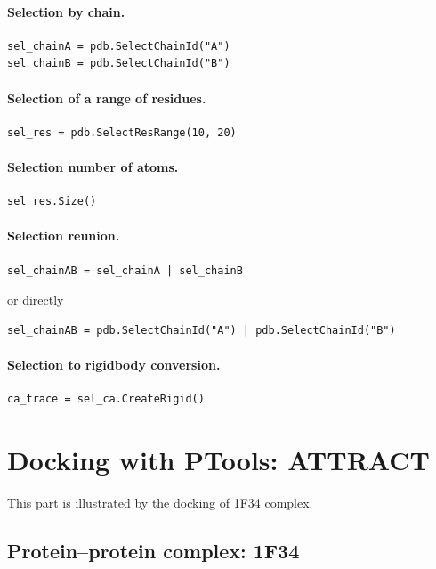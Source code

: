 \documentclass[12pt,a4paper]{article}
\begin{document}
\paragraph{Selection by chain.}
\begin{verbatim}
sel_chainA = pdb.SelectChainId("A")
sel_chainB = pdb.SelectChainId("B")
\end{verbatim}


\paragraph{Selection of a range of residues.}
\begin{verbatim}
sel_res = pdb.SelectResRange(10, 20)
\end{verbatim}


\paragraph{Selection number of atoms.}
\begin{verbatim}
sel_res.Size()
\end{verbatim}



\paragraph{Selection reunion.}
\begin{verbatim}
sel_chainAB = sel_chainA | sel_chainB
\end{verbatim}
or directly
\begin{verbatim}
sel_chainAB = pdb.SelectChainId("A") | pdb.SelectChainId("B")
\end{verbatim}


\paragraph{Selection to rigidbody conversion.}
\begin{verbatim}
ca_trace = sel_ca.CreateRigid()
\end{verbatim}



\section{Docking with PTools: ATTRACT}

This part is illustrated by the docking of 1F34 complex.

\subsection{Protein--protein complex: 1F34}
\end{document}
